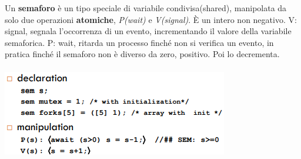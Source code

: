 \documentclass[10pt,a4paper]{article}
\begin{document}
Un \textbf{semaforo} è un tipo speciale di variabile condivisa(shared), manipolata da solo due operazioni \textbf{atomiche}, \textit{P(wait)} e \textit{V(signal)}.
\`{E} un intero non negativo.
V: signal, segnala l'occorrenza di un evento, incrementando il valore della variabile semaforica.
P: wait, ritarda un processo finché non si verifica un evento, in pratica finché il semaforo non è diverso da zero, positivo. Poi lo decrementa.\\ \\
\includegraphics[scale=0.7]{img/sem.png} \\
\end{document}
